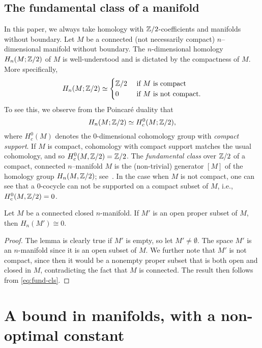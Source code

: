 \documentclass[11pt, reqno, english]{amsart}
\begin{document}
\subsection*{The fundamental class of a manifold}
In this paper, we always take homology with $\mathbb{Z}/2$-coefficients and manifolds
without boundary. 
Let $M$ be a connected (not necessarily compact) $n$--dimensional manifold without boundary. 
The $n$-dimensional homology $H_n(M;\mathbb{Z}/2)$ of $M$ is well-understood and is dictated by the compactness of $M$.
More specifically, 
\begin{equation}\label{eq:fund-cls}
    H_n(M;\mathbb{Z}/2)\simeq\begin{cases} 
    \mathbb{Z}/2&\text{ if }M\text{ is compact} \\
    0&\text{ if }M\text{ is not compact}.
    \end{cases}
\end{equation}
To see this, we observe from the Poincar\'e duality that 
\[
H_n(M;\mathbb{Z}/2)\simeq H^0_c(M;\mathbb{Z}/2),
\]
where $H^0_c(M)$ denotes the $0$-dimensional cohomology group with \emph{compact support}. 
If $M$ is compact, cohomology with compact support matches the usual cohomology, and so $H^0_c(M,\mathbb{Z}/2)=\mathbb{Z}/2$. 
The \emph{fundamental class} over $\mathbb{Z}/2$ of a compact, connected $n$--manifold $M$ is the (non-trivial) generator $[M]$ of the homology group $H_n(M,\mathbb{Z}/2)$; see~\cite{hausmann2015mod}. 
In the case when $M$ is not compact, one can see that a $0$-cocycle can not be supported on a compact subset of $M$, i.e., $H^0_c(M,\mathbb{Z}/2)=0$. 

\vspace{3mm}
\begin{lemma}
\label{lem:proper-subset}
Let $M$ be a connected closed $n$-manifold.
If $M'$ is an open proper subset of $M$, then $H_n(M') \cong 0$. 
\end{lemma}

\begin{proof}
The lemma is clearly true if $M'$ is empty, so let $M'\neq\emptyset$.
The space $M'$ is an $n$-manifold since it is an open subset of $M$.
We further note that $M'$ is not compact, since then it would be a nonempty proper subset that is both open and closed in $M$, contradicting the fact that $M$ is connected.
The result then follows from \eqref{eq:fund-cls}.
\end{proof}



\section{A bound in manifolds, with a non-optimal constant}
\label{sec:manifold-simple}
\end{document}
